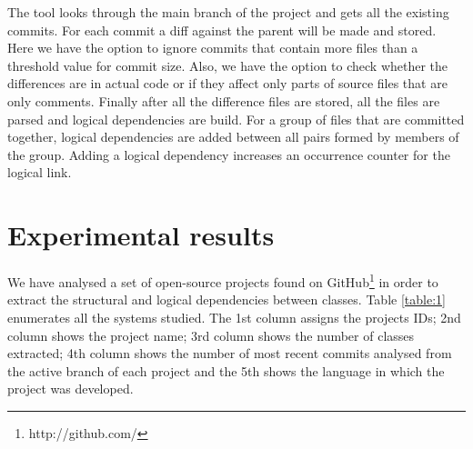 \documentclass[a4paper,twoside]{article}
\begin{document}
The tool looks through the main branch of the project and gets all the existing commits. For each commit a diff against the parent will be made and stored. Here we have the option to ignore commits that contain more files than a threshold value for commit size. Also, we have the option to check whether the differences are in actual code or if they affect only parts of source files that are only comments.  Finally after all the difference files are stored, all the files are parsed and logical dependencies are build. For a group of files that are committed together, logical dependencies are added between all pairs formed by members of the group. Adding a logical dependency increases an occurrence counter for the logical link. 

\section{Experimental results}
\label{sec:experiments}


We have analysed a set of open-source projects found on GitHub\footnote{http://github.com/} in order to extract the structural and logical dependencies between classes. Table \ref{table:1} enumerates all the systems studied. The 1st column assigns the projects IDs; 2nd column shows the project name; 3rd column shows the number of classes extracted; 4th column shows the number of most recent commits analysed from the active branch of each project and the 5th shows the language in which the project was developed.
\end{document}
